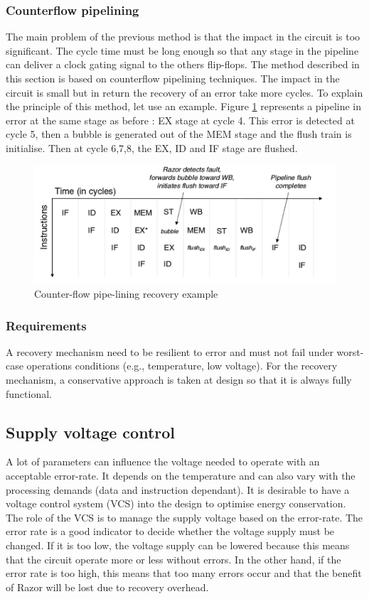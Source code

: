 \documentclass[fleqn,envcountsame,runningheads,10pt,a4paper]{llncs}
\begin{document}
\subsubsection{Counterflow pipelining}
The main problem of the previous method is that the impact in the circuit is too significant. The cycle time must be long enough so that any stage in the pipeline can deliver a clock gating signal to the others flip-flops. The method described in this section is based on counterflow pipelining techniques\cite{Molnar:1994}. The impact in the circuit is small but in return the recovery of an error take more cycles. 
To explain the principle of this method, let use an example. Figure \ref{figure5} represents a pipeline in error at the same stage as before : EX stage at cycle 4. This error is detected at cycle 5, then a bubble is generated out of the MEM stage and the flush train is initialise. Then at cycle 6,7,8, the EX, ID and IF stage are flushed. 
\begin{figure}[!h]
    \centering
   \centerline{\includegraphics[scale=0.3]{./img/figure5.png}}
   \caption{\label{figure5}Counter-flow pipe-lining recovery example\cite{Barthou:1998}}
\end{figure}

\subsubsection{Requirements}
A recovery mechanism need to be resilient to error and must not fail under worst-case operations conditions (e.g., temperature, low voltage). For the recovery mechanism, a conservative approach is taken at design so that it is always fully functional. 

\subsection{Supply voltage control}
\label{SVC}
A lot of parameters can influence the voltage needed to operate with an acceptable error-rate. It depends on the temperature and can also vary with the processing demands (data and instruction dependant). It is desirable to have a voltage control system (VCS) into the design to optimise energy conservation. The role of the VCS is to manage the supply voltage based on the error-rate. The error rate is a good indicator to decide whether the voltage supply must be changed. If it is too low, the voltage supply can be lowered because this means that the circuit operate more or less without errors. In the other hand, if the error rate is too high, this means that too many errors occur and that the benefit of Razor will be lost due to recovery overhead.
\end{document}
